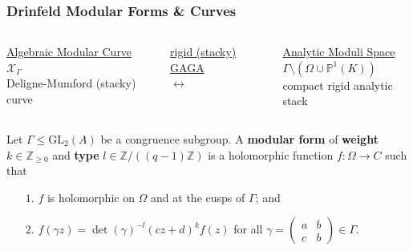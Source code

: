 \documentclass{beamer}
\numberwithin{equation}{section}
\numberwithin{case}{theorem}
\newcommand{\sX}{\mathscr{X}}		%
\newcommand{\bbP}{\mathbb{P}}		%
\newcommand{\bbZ}{\mathbb{Z}}		%
\newcommand{\GL}{\mathrm{GL}} 	%
\newcommand{\<}{\left\langle}
\renewcommand{\>}{\right\rangle}
\begin{document}
\begin{frame}
	\frametitle{Drinfeld Modular Forms \& Curves}
		\begin{columns}
		\begin{column}{.3\textwidth}
			\centering
			\underline{Algebraic Modular Curve}\\
			$\sX_{\Gamma}$\\
			Deligne-Mumford (stacky) curve
		\end{column}\pause
		\begin{column}{.3\textwidth}
			\centering
			\underline{rigid (stacky) GAGA}\\
			$\leftrightarrow$
		\end{column}\pause
		\begin{column}{.3\textwidth}
			\centering
			\underline{Analytic Moduli Space}\\
			$\Gamma\setminus(\Omega\cup\bbP^1(K))$\\
			compact rigid analytic stack
		\end{column}
	\end{columns}\pause
	
	\begin{definition}
		Let $\Gamma\leq \GL_2(A)$ be a congruence subgroup. A \textbf{modular form} of \textbf{weight} $k\in \bbZ_{\geq0}$ and \textbf{type} $l\in \bbZ/((q-1) \bbZ)$ is a holomorphic function $f:\Omega\to C$ such that\pause 
		\begin{itemize}
			\item[$1.$] $f$ is holomorphic on $\Omega$ and at the cusps of $\Gamma$; and \pause
			\item[$2.$] $f(\gamma z)=\det(\gamma)^{-l}(cz+d)^kf(z)$ for all $\gamma=\left(\begin{array}{cc}a&b\\c&b\end{array}\right)\in \Gamma.$
		\end{itemize}
	\end{definition}
\end{frame}
\end{document}
